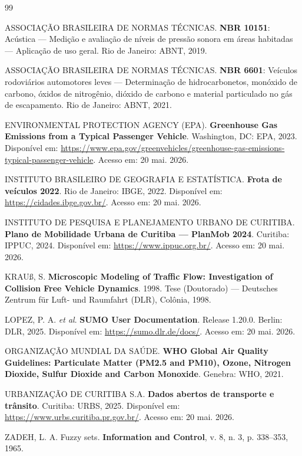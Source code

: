 \documentclass[12pt,a4paper,oneside]{abntex2}
\begin{document}
\begin{thebibliography}{99}

ASSOCIAÇÃO BRASILEIRA DE NORMAS TÉCNICAS.
\textbf{NBR 10151}: Acústica --- Medição e avaliação de níveis de pressão sonora em áreas habitadas --- Aplicação de uso geral.
Rio de Janeiro: ABNT, 2019.

ASSOCIAÇÃO BRASILEIRA DE NORMAS TÉCNICAS.
\textbf{NBR 6601}: Veículos rodoviários automotores leves --- Determinação de hidrocarbonetos, monóxido de carbono, óxidos de nitrogênio, dióxido de carbono e material particulado no gás de escapamento.
Rio de Janeiro: ABNT, 2021.

ENVIRONMENTAL PROTECTION AGENCY (EPA).
\textbf{Greenhouse Gas Emissions from a Typical Passenger Vehicle}.
Washington, DC: EPA, 2023. Disponível em: \url{https://www.epa.gov/greenvehicles/greenhouse-gas-emissions-typical-passenger-vehicle}. Acesso em: 20 mai. 2026.

INSTITUTO BRASILEIRO DE GEOGRAFIA E ESTATÍSTICA.
\textbf{Frota de veículos 2022}. Rio de Janeiro: IBGE, 2022. Disponível em: \url{https://cidades.ibge.gov.br/}. Acesso em: 20 mai. 2026.

INSTITUTO DE PESQUISA E PLANEJAMENTO URBANO DE CURITIBA.
\textbf{Plano de Mobilidade Urbana de Curitiba --- PlanMob 2024}.
Curitiba: IPPUC, 2024. Disponível em: \url{https://www.ippuc.org.br/}. Acesso em: 20 mai. 2026.

KRAUß, S.
\textbf{Microscopic Modeling of Traffic Flow: Investigation of Collision Free Vehicle Dynamics}.
1998. Tese (Doutorado) --- Deutsches Zentrum für Luft- und Raumfahrt (DLR), Colônia, 1998.

LOPEZ, P. A. \textit{et al}.
\textbf{SUMO User Documentation}. Release 1.20.0. Berlin: DLR, 2025.
Disponível em: \url{https://sumo.dlr.de/docs/}. Acesso em: 20 mai. 2026.

ORGANIZAÇÃO MUNDIAL DA SAÚDE.
\textbf{WHO Global Air Quality Guidelines: Particulate Matter (PM2.5 and PM10), Ozone, Nitrogen Dioxide, Sulfur Dioxide and Carbon Monoxide}.
Genebra: WHO, 2021.

URBANIZAÇÃO DE CURITIBA S.A.
\textbf{Dados abertos de transporte e trânsito}. Curitiba: URBS, 2025.
Disponível em: \url{https://www.urbs.curitiba.pr.gov.br/}. Acesso em: 20 mai. 2026.

ZADEH, L. A.
Fuzzy sets.
\textbf{Information and Control}, v. 8, n. 3, p. 338--353, 1965.

\end{thebibliography}
\end{document}
